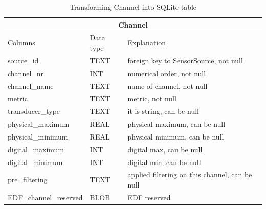 \begin{table}
\begin{center}
\begin{tabular}{ |p{4cm}|p{1.8cm}|p{6.2cm}|  }
 \hline
 \multicolumn{3}{|c|}{Channel} \\
 \hline
 Columns& Data type & Explanation \\
 \hline
 source\_id& TEXT& foreign key to SensorSource, not null\\
 channel\_nr& INT& numerical order, not null\\
 channel\_name& TEXT& name of channel, not null\\
 metric& TEXT& metric, not null\\
 transducer\_type& TEXT& it is string, can be null\\
 physical\_maximum& REAL& physical maximum, can be null\\
 physical\_minimum& REAL& physical minimum, can be null\\
 digital\_maximum& INT& digital max, can be null\\
 digital\_minimum& INT& digital min, can be null\\
 pre\_filtering& TEXT& applied filtering on this channel, can be null\\
 EDF\_channel\_reserved& BLOB& EDF reserved\\
 \hline
\end{tabular}
\end{center}
\caption{Transforming Channel into SQLite table}
\label{tab:ChannelTypeSQL}
\end{table}

